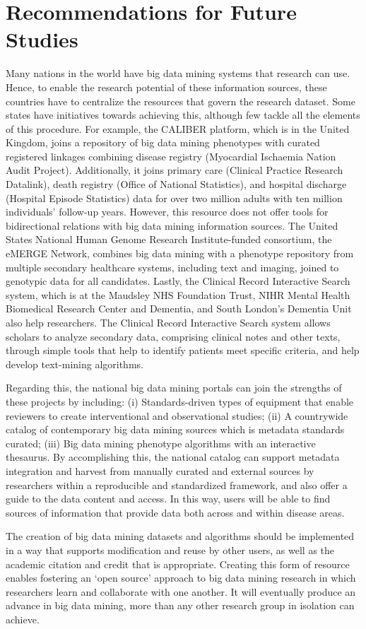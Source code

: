 \section{Recommendations for Future Studies}

Many nations in the world have big data mining systems that research
can use.  Hence, to enable the research potential of these information
sources, these countries have to centralize the resources that govern
the research dataset. 
Some states have initiatives towards achieving this, although few
tackle all the elements of this procedure. 
For example, the CALIBER platform, which is in the United Kingdom,
joins a repository of big data mining phenotypes with curated
registered linkages combining disease registry (Myocardial Ischaemia
Nation Audit Project). 
Additionally, it joins primary care (Clinical Practice Research
Datalink), death registry (Office of National Statistics), and
hospital discharge (Hospital Episode Statistics) data for over two
million adults with ten million individuals’ follow-up years. 
However, this resource does not offer tools for bidirectional
relations with big data mining information sources. 
The United States National Human Genome Research Institute-funded
consortium, the eMERGE Network, combines big data mining with a
phenotype repository from multiple secondary healthcare systems,
including text and imaging, joined to genotypic data for all
candidates. 
Lastly, the Clinical Record Interactive Search system, which is at the
Maudsley NHS Foundation Trust, NIHR Mental Health Biomedical Research
Center and Dementia, and South London's Dementia Unit also help
researchers. 
The Clinical Record Interactive Search system allows scholars to
analyze secondary data, comprising clinical notes and other texts,
through simple tools that help to identify patients meet specific
criteria, and help develop text-mining algorithms. 
\par Regarding this, the national big data mining portals can join the
strengths of these projects by including: (i) Standards-driven types
of equipment that enable reviewers to create interventional and
observational studies; 
(ii) A countrywide catalog of contemporary big data mining sources
which is metadata standards curated; 
(iii)  Big data mining phenotype algorithms with an interactive
thesaurus. 
By accomplishing this, the national catalog can support metadata
integration and harvest from manually curated and external sources by
researchers within a reproducible and standardized framework, and also
offer a guide to the data content and access. 
In this way, users will be able to find sources of information that
provide data both across and within disease areas. 
\par The creation of big data mining datasets and algorithms should be
implemented in a way that supports modification and reuse by other
users, as well as the academic citation and credit that is
appropriate. Creating this form of resource enables fostering an `open
source' approach to big data mining research in which researchers
learn and collaborate with one another. It will eventually produce an
advance in big data mining, more than any other research group in
isolation can achieve.


